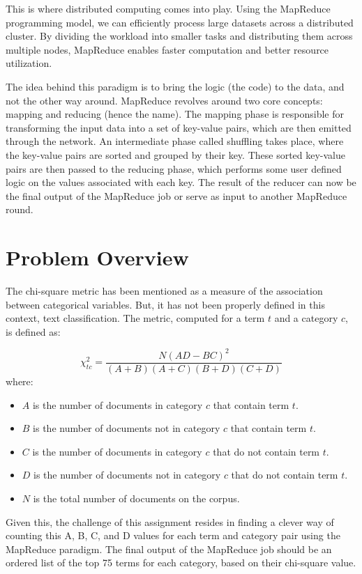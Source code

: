 \documentclass[11pt]{article}
\begin{document}
This is where distributed computing comes into play. Using the MapReduce programming model, we can efficiently process large datasets across a distributed cluster. By dividing the workload into smaller tasks and distributing them across multiple nodes, MapReduce enables faster computation and better resource utilization.

The idea behind this paradigm is to bring the logic (the code) to the data, and not the other way around. MapReduce revolves around two core concepts: mapping and reducing (hence the name). The mapping phase is responsible for transforming the input data into a set of key-value pairs, which are then emitted through the network. An intermediate phase called shuffling takes place, where the key-value pairs are sorted and grouped by their key. These sorted key-value pairs are then passed to the reducing phase, which performs some user defined logic on the values associated with each key. The result of the reducer can now be the final output of the MapReduce job or serve as input to another MapReduce round.

\section{Problem Overview}

The chi-square metric has been mentioned as a measure of the association between categorical variables. But, it has not been properly defined in this context, text classification. The metric, computed for a term $t$ and a category $c$, is defined as:

$$
\chi^2_{tc} = \frac{N(AD - BC)^2}{(A + B)(A + C)(B + D)(C + D)}
$$
where:
\begin{itemize}
    \item $A$ is the number of documents in category $c$ that contain term $t$.
    \item $B$ is the number of documents not in category $c$ that contain term $t$.
    \item $C$ is the number of documents in category $c$ that do not contain term $t$.
    \item $D$ is the number of documents not in category $c$ that do not contain term $t$.
    \item $N$ is the total number of documents on the corpus.
\end{itemize}

Given this, the challenge of this assignment resides in finding a clever way of counting this A, B, C, and D values for each term and category pair using the MapReduce paradigm. The final output of the MapReduce job should be an ordered list of the top 75 terms for each category, based on their chi-square value.
\end{document}
